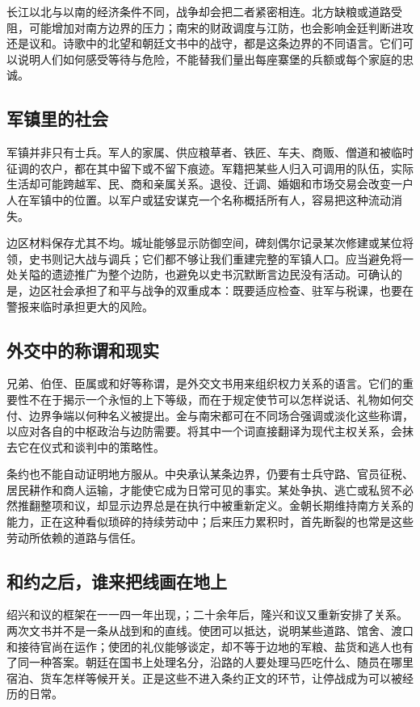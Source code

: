 长江以北与以南的经济条件不同，战争却会把二者紧密相连。北方缺粮或道路受阻，可能增加对南方边界的压力；南宋的财政调度与江防，也会影响金廷判断进攻还是议和。诗歌中的北望和朝廷文书中的战守，都是这条边界的不同语言。它们可以说明人们如何感受等待与危险，不能替我们量出每座寨堡的兵额或每个家庭的忠诚。

\subsection{军镇里的社会}

军镇并非只有士兵。军人的家属、供应粮草者、铁匠、车夫、商贩、僧道和被临时征调的农户，都在其中留下或不留下痕迹。军籍把某些人归入可调用的队伍，实际生活却可能跨越军、民、商和亲属关系。退役、迁调、婚姻和市场交易会改变一户人在军镇中的位置。以军户或猛安谋克一个名称概括所有人，容易把这种流动消失。

边区材料保存尤其不均。城址能够显示防御空间，碑刻偶尔记录某次修建或某位将领，史书则记大战与调兵；它们都不够让我们重建完整的军镇人口。应当避免将一处关隘的遗迹推广为整个边防，也避免以史书沉默断言边民没有活动。可确认的是，边区社会承担了和平与战争的双重成本：既要适应检查、驻军与税课，也要在警报来临时承担更大的风险。

\subsection{外交中的称谓和现实}

兄弟、伯侄、臣属或和好等称谓，是外交文书用来组织权力关系的语言。它们的重要性不在于揭示一个永恒的上下等级，而在于规定使节可以怎样说话、礼物如何交付、边界争端以何种名义被提出。金与南宋都可在不同场合强调或淡化这些称谓，以应对各自的中枢政治与边防需要。将其中一个词直接翻译为现代主权关系，会抹去它在仪式和谈判中的策略性。

条约也不能自动证明地方服从。中央承认某条边界，仍要有士兵守路、官员征税、居民耕作和商人运输，才能使它成为日常可见的事实。某处争执、逃亡或私贸不必然推翻整项和议，却显示边界总是在执行中被重新定义。金朝长期维持南方关系的能力，正在这种看似琐碎的持续劳动中；后来压力累积时，首先断裂的也常是这些劳动所依赖的道路与信任。

\subsection{和约之后，谁来把线画在地上}

绍兴和议的框架在一一四一年出现，；二十余年后，隆兴和议又重新安排了关系。两次文书并不是一条从战到和的直线。使团可以抵达，说明某些道路、馆舍、渡口和接待官尚在运作；使团的礼仪能够谈定，却不等于边地的军粮、盐货和逃人也有了同一种答案。朝廷在国书上处理名分，沿路的人要处理马匹吃什么、随员在哪里宿泊、货车怎样等候开关。正是这些不进入条约正文的环节，让停战成为可以被经历的日常。

